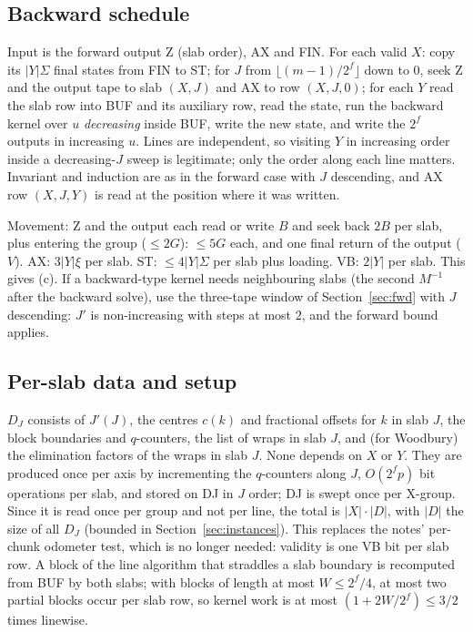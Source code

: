 \documentclass[11pt]{article}
\theoremstyle{definition}\newtheorem{definition}{Definition}
\theoremstyle{remark}\newtheorem*{remark}{Remark}
\begin{document}
\subsection{Backward schedule}\label{sec:bwd}
Input is the forward output Z (slab order), AX and FIN. For each valid $X$: copy its $|Y|\Sigma$
final states from FIN to ST; for $J$ from $\lfloor(m-1)/2^f\rfloor$ down to $0$, seek Z and the
output tape to slab $(X,J)$ and AX to row $(X,J,0)$; for each $Y$ read the slab row into BUF and
its auxiliary row, read the state, run the backward kernel over $u$ \emph{decreasing} inside
BUF, write the new state, and write the $2^f$ outputs in increasing $u$. Lines are independent,
so visiting $Y$ in increasing order inside a decreasing-$J$ sweep is legitimate; only the order
along each line matters. Invariant and induction are as in the forward case with $J$
descending, and AX row $(X,J,Y)$ is read at the position where it was written.

Movement: Z and the output each read or write $B$ and seek back $2B$ per slab, plus entering
the group ($\le2G$): $\le5G$ each, and one final return of the output ($V$). AX:
$3|Y|\xi$ per slab. ST: $\le4|Y|\Sigma$ per slab plus loading. VB: $2|Y|$ per slab. This gives
(c). If a backward-type kernel needs neighbouring slabs (the second $M^{-1}$ after the backward
solve), use the three-tape window of Section~\ref{sec:fwd} with $J$ descending: $J'$ is
non-increasing with steps at most $2$, and the forward bound applies.

\subsection{Per-slab data and setup}
$D_J$ consists of $J'(J)$, the centres $c(k)$ and fractional offsets for $k$ in slab $J$, the
block boundaries and $q$-counters, the list of wraps in slab $J$, and (for Woodbury) the
elimination factors of the wraps in slab $J$. None depends on $X$ or $Y$. They are produced once
per axis by incrementing the $q$-counters along $J$, $O(2^fp)$ bit operations per slab, and stored
on DJ in $J$ order; DJ is swept once per X-group. Since it is read once per group and not per
line, the total is $|X|\cdot|D|$, with $|D|$ the size of all $D_J$ (bounded in
Section~\ref{sec:instances}). This replaces the notes' per-chunk odometer test, which is no
longer needed: validity is one VB bit per slab row. A block of the line algorithm that
straddles a slab boundary is recomputed from BUF by both slabs; with blocks of length at most
$W\le2^f/4$, at most two partial blocks occur per slab row, so kernel work is at most
$(1+2W/2^f)\le3/2$ times linewise.
\end{document}
